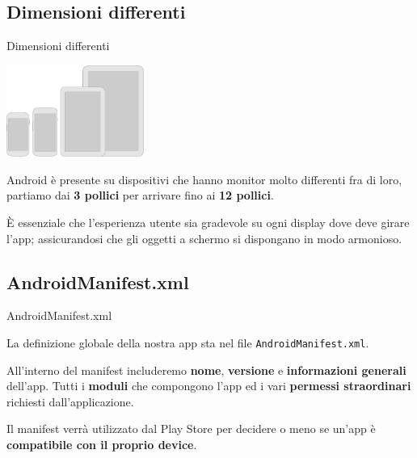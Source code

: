 \documentclass[xcolor=svgnames,11pt]{beamer}
\begin{document}
\subsection{Dimensioni differenti}
\begin{frame}{Dimensioni differenti}

\begin{center}

\includegraphics[height=3cm]{devices.png}

\end{center}

\medskip

Android \`e presente su dispositivi che hanno monitor molto differenti fra di loro, partiamo dai \textbf{3 pollici} per arrivare fino ai \textbf{12 pollici}.

\medskip
\pause

\begin{block}{}
\`E essenziale che l'esperienza utente sia gradevole su ogni display dove deve girare l'app; assicurandosi che gli oggetti a schermo si dispongano in modo armonioso. 
\end{block}

\end{frame}

\subsection{AndroidManifest.xml}
\begin{frame}{AndroidManifest.xml}

La definizione globale della nostra app sta nel file \texttt{AndroidManifest.xml}.

\medskip
\pause

All'interno del manifest includeremo \textbf{nome}, \textbf{versione} e \textbf{informazioni generali} dell'app. Tutti i \textbf{moduli} che compongono l'app ed i vari \textbf{permessi straordinari} richiesti dall'applicazione.

\medskip
\pause

\begin{block}{}
Il manifest verr\`a utilizzato dal Play Store per decidere o meno se un'app \`e \textbf{compatibile con il proprio device}.
\end{block}

\end{frame}
\end{document}
